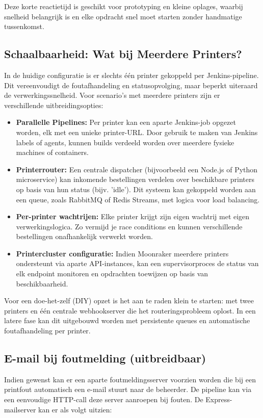 \begin{enumerate}
Deze korte reactietijd is geschikt voor prototyping en kleine oplages, waarbij snelheid belangrijk is en elke opdracht snel moet starten zonder handmatige tussenkomst.

\subsection{Schaalbaarheid: Wat bij Meerdere Printers?}

In de huidige configuratie is er slechts één printer gekoppeld per Jenkins-pipeline. Dit vereenvoudigt de foutafhandeling en statusopvolging, maar beperkt uiteraard de verwerkingssnelheid. Voor scenario’s met meerdere printers zijn er verschillende uitbreidingsopties:

\begin{itemize}
    \item \textbf{Parallelle Pipelines:} Per printer kan een aparte Jenkins-job opgezet worden, elk met een unieke printer-URL. Door gebruik te maken van Jenkins labels of agents, kunnen builds verdeeld worden over meerdere fysieke machines of containers.
    
    \item \textbf{Printerrouter:} Een centrale dispatcher (bijvoorbeeld een Node.js of Python microservice) kan inkomende bestellingen verdelen over beschikbare printers op basis van hun status (bijv. 'idle'). Dit systeem kan gekoppeld worden aan een queue, zoals RabbitMQ of Redis Streams, met logica voor load balancing.
    
    \item \textbf{Per-printer wachtrijen:} Elke printer krijgt zijn eigen wachtrij met eigen verwerkingslogica. Zo vermijd je race conditions en kunnen verschillende bestellingen onafhankelijk verwerkt worden.
    
    \item \textbf{Printercluster configuratie:} Indien Moonraker meerdere printers ondersteunt via aparte API-instances, kan een supervisorproces de status van elk endpoint monitoren en opdrachten toewijzen op basis van beschikbaarheid.
\end{itemize}

Voor een doe-het-zelf (DIY) opzet is het aan te raden klein te starten: met twee printers en één centrale webhookserver die het routeringsprobleem oplost. In een latere fase kan dit uitgebouwd worden met persistente queues en automatische foutafhandeling per printer.


\subsection{E-mail bij foutmelding (uitbreidbaar)}
Indien gewenst kan er een aparte foutmeldingsserver voorzien worden die bij een printfout automatisch een e-mail stuurt naar de beheerder. De pipeline kan via een eenvoudige HTTP-call deze server aanroepen bij fouten. De Express-mailserver kan er als volgt uitzien:


\end{enumerate}

